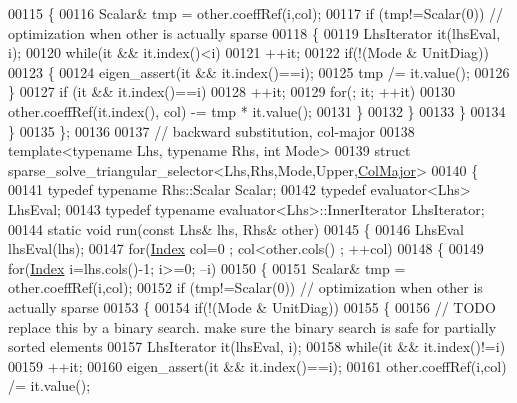 \begin{DoxyCode}
00115       \{
00116         Scalar& tmp = other.coeffRef(i,col);
00117         \textcolor{keywordflow}{if} (tmp!=Scalar(0)) \textcolor{comment}{// optimization when other is actually sparse}
00118         \{
00119           LhsIterator it(lhsEval, i);
00120           \textcolor{keywordflow}{while}(it && it.index()<i)
00121             ++it;
00122           \textcolor{keywordflow}{if}(!(Mode & UnitDiag))
00123           \{
00124             eigen\_assert(it && it.index()==i);
00125             tmp /= it.value();
00126           \}
00127           \textcolor{keywordflow}{if} (it && it.index()==i)
00128             ++it;
00129           \textcolor{keywordflow}{for}(; it; ++it)
00130             other.coeffRef(it.index(), col) -= tmp * it.value();
00131         \}
00132       \}
00133     \}
00134   \}
00135 \};
00136 
00137 \textcolor{comment}{// backward substitution, col-major}
00138 \textcolor{keyword}{template}<\textcolor{keyword}{typename} Lhs, \textcolor{keyword}{typename} Rhs, \textcolor{keywordtype}{int} Mode>
00139 \textcolor{keyword}{struct }sparse\_solve\_triangular\_selector<Lhs,Rhs,Mode,Upper,\hyperlink{group__enums_ggaacded1a18ae58b0f554751f6cdf9eb13a0cbd4bdd0abcfc0224c5fcb5e4f6669a}{ColMajor}>
00140 \{
00141   \textcolor{keyword}{typedef} \textcolor{keyword}{typename} Rhs::Scalar Scalar;
00142   \textcolor{keyword}{typedef} evaluator<Lhs> LhsEval;
00143   \textcolor{keyword}{typedef} \textcolor{keyword}{typename} evaluator<Lhs>::InnerIterator LhsIterator;
00144   \textcolor{keyword}{static} \textcolor{keywordtype}{void} run(\textcolor{keyword}{const} Lhs& lhs, Rhs& other)
00145   \{
00146     LhsEval lhsEval(lhs);
00147     \textcolor{keywordflow}{for}(\hyperlink{namespace_eigen_a62e77e0933482dafde8fe197d9a2cfde}{Index} col=0 ; col<other.cols() ; ++col)
00148     \{
00149       \textcolor{keywordflow}{for}(\hyperlink{namespace_eigen_a62e77e0933482dafde8fe197d9a2cfde}{Index} i=lhs.cols()-1; i>=0; --i)
00150       \{
00151         Scalar& tmp = other.coeffRef(i,col);
00152         \textcolor{keywordflow}{if} (tmp!=Scalar(0)) \textcolor{comment}{// optimization when other is actually sparse}
00153         \{
00154           \textcolor{keywordflow}{if}(!(Mode & UnitDiag))
00155           \{
00156             \textcolor{comment}{// TODO replace this by a binary search. make sure the binary search is safe for partially
       sorted elements}
00157             LhsIterator it(lhsEval, i);
00158             \textcolor{keywordflow}{while}(it && it.index()!=i)
00159               ++it;
00160             eigen\_assert(it && it.index()==i);
00161             other.coeffRef(i,col) /= it.value();

\end{DoxyCode}
